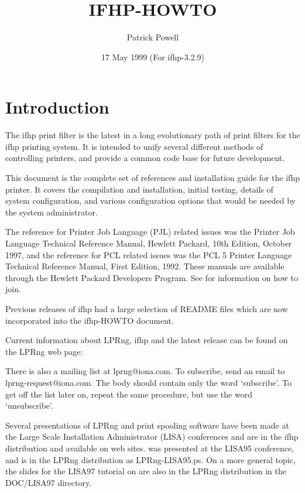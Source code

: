 \documentclass[a4paper]{article}
\title{ IFHP-HOWTO}
\author{Patrick Powell
{\ttfamily \onlynameurl{papowell@astart.com}}}
\date{ 17 May 1999 (For ifhp-3.2.9)}
\begin{document}
\maketitle
\tableofcontents

\section{Introduction}

The {\ttfamily ifhp} print filter is the latest in a long evolutionary path
of print filters for the {\ttfamily ifhp} printing system.
It is intended to unify several different methods of controlling
printers,  and provide a common code base for future development.

This document is the complete set of references and
installation guide for the {\ttfamily ifhp} printer.
It covers the compilation and installation,
initial testing,
details of system configuration,
and various configuration options that would be needed by the
system administrator.

The reference for Printer Job Language (PJL) related issues
was the Printer Job Language Technical Reference Manual,
Hewlett Packard, 10th Edition, October 1997,
and the reference for PCL related issues was
the PCL 5 Printer Language Technical Reference Manual,
First Edition, 1992.
These manuals are available through the Hewlett Packard Developers Program.
See
for information on how to join.

Previous releases of {\ttfamily ifhp} had a large selection of
{\ttfamily README}
files
which are now incorporated into the {\ttfamily ifhp}-HOWTO document.

Current information
about LPRng, {\ttfamily ifhp} and the latest release can be found on the LPRng web page:


There is also a mailing list at {\ttfamily lprng@iona.com}. To subscribe,
send an email to {\ttfamily lprng-request@iona.com}. The body should contain
only the word `subscribe'. To get off the list later on, repeat the
same procedure, but use the word `unsubscribe'.

Several presentations of LPRng and print spooling software have been made
at the Large Scale Installation Administrator (LISA) conferences and
are in the {\ttfamily ifhp} distribution and available on web sites.
was presented at the LISA95 conference,
and is in the LPRng distribution as LPRng-LISA95.ps.
On a more general topic,
the slides for the LISA97 tutorial on
are also in the LPRng distribution in the DOC/LISA97 directory.
\end{document}
